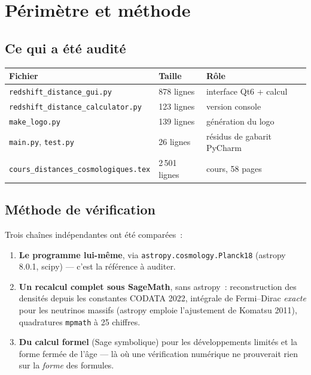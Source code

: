 \documentclass[11pt,a4paper]{report}
\begin{document}
\chapter{Périmètre et méthode}

\section{Ce qui a été audité}

\begin{center}
\renewcommand{\arraystretch}{1.25}
\begin{tabular}{lll}
\toprule
\textbf{Fichier} & \textbf{Taille} & \textbf{Rôle} \\
\midrule
\texttt{redshift\_distance\_gui.py} & 878 lignes & interface Qt6 + calcul \\
\texttt{redshift\_distance\_calculator.py} & 123 lignes & version console \\
\texttt{make\_logo.py} & 139 lignes & génération du logo \\
\texttt{main.py}, \texttt{test.py} & 26 lignes & résidus de gabarit PyCharm \\
\texttt{cours\_distances\_cosmologiques.tex} & 2\,501 lignes & cours, 58 pages \\
\bottomrule
\end{tabular}
\end{center}

\section{Méthode de vérification}

Trois chaînes indépendantes ont été comparées~:

\begin{enumerate}[topsep=3pt]
\item \textbf{Le programme lui-même}, via \texttt{astropy.cosmology.Planck18}
(astropy 8.0.1, scipy) --- c'est la référence à auditer.
\item \textbf{Un recalcul complet sous SageMath}, sans astropy~: reconstruction
des densités depuis les constantes CODATA 2022, intégrale de Fermi--Dirac
\emph{exacte} pour les neutrinos massifs (astropy emploie l'ajustement de
Komatsu 2011), quadratures \texttt{mpmath} à 25 chiffres.
\item \textbf{Du calcul formel} (Sage symbolique) pour les développements
limités et la forme fermée de l'âge --- là où une vérification numérique ne
prouverait rien sur la \emph{forme} des formules.
\end{enumerate}
\end{document}
